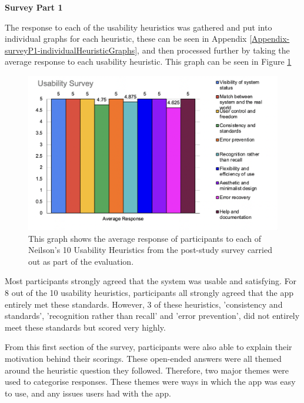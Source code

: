 \documentclass{l4proj}
\begin{document}
\textbf{Survey Part 1}
 
The response to each of the usability heuristics was gathered and put into individual graphs for each heuristic, these can be seen in Appendix \ref{Appendix-surveyP1-individualHeuristicGraphs}, and then processed further by taking the average response to each usability heuristic. This graph can be seen in Figure \ref{fig: UserStudyGraph}

\begin{figure}[H]
    \begin{centering}
    \includegraphics[scale=0.75]{images/UserStudyGraph.png}
    \caption{This graph shows the average response of participants to each of Neilson's 10 Usability Heuristics from the post-study survey carried out as part of the evaluation.}
    \label{fig: UserStudyGraph}
    \end{centering}
\end{figure}
 
Most participants strongly agreed that the system was usable and satisfying. For 8 out of the 10 usability heuristics, participants all strongly agreed that the app entirely met these standards. However, 3 of these heuristics, 'consistency and standards', 'recognition rather than recall' and 'error prevention', did not entirely meet these standards but scored very highly.
 
From this first section of the survey, participants were also able to explain their motivation behind their scorings. These open-ended answers were all themed around the heuristic question they followed. Therefore, two major themes were used to categorise responses. These themes were ways in which the app was easy to use, and any issues users had with the app.
\end{document}
